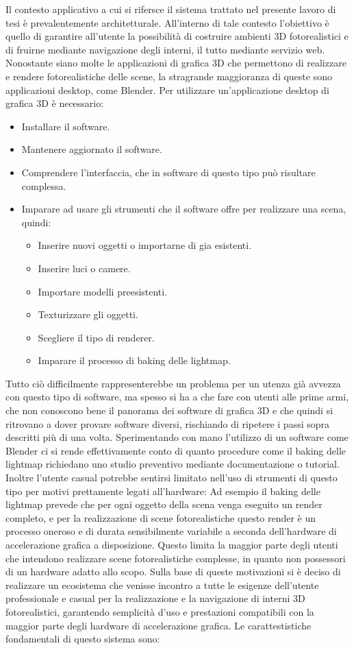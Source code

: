 Il contesto applicativo a cui si rifersce il sistema trattato nel presente lavoro di tesi è prevalentemente architetturale.
All’interno di tale contesto l’obiettivo è quello di garantire all’utente la possibilità di costruire ambienti 3D fotorealistici e di fruirne mediante navigazione degli interni, il tutto mediante servizio web. 
Nonostante siano molte le applicazioni di grafica 3D che permettono di realizzare e rendere fotorealistiche delle scene, la stragrande maggioranza di queste sono applicazioni desktop, come Blender.
Per utilizzare un’applicazione desktop di grafica 3D è necessario:
\begin{itemize}
\item Installare il software.
\item Mantenere aggiornato il software.
\item Comprendere l’interfaccia, che in software di questo tipo può risultare complessa.
\item Imparare ad usare gli strumenti che il software offre per realizzare una scena, quindi:
\begin{itemize}
\item Inserire nuovi oggetti o importarne di gia esistenti.
\item Inserire luci o camere.
\item Importare modelli preesistenti. 
\item Texturizzare gli oggetti.
\item Scegliere il tipo di renderer.
\item Imparare il processo di baking delle lightmap.
\end{itemize}
\end{itemize}
Tutto ciò difficilmente rappresenterebbe un problema per un utenza già avvezza con questo tipo di software, ma spesso si ha a che fare con utenti alle prime armi, che non conoscono bene il panorama dei software di grafica 3D e che quindi si ritrovano a dover provare software diversi, rischiando di ripetere i passi sopra descritti più di una volta. Sperimentando con mano l’utilizzo di un software come Blender ci si rende effettivamente conto di quanto procedure come il baking delle lightmap richiedano uno studio preventivo mediante documentazione o tutorial. Inoltre l’utente casual potrebbe sentirsi limitato nell’uso di strumenti di questo tipo per motivi prettamente legati all’hardware:
Ad esempio il baking delle lightmap prevede che per ogni oggetto della scena venga eseguito un render completo, e per la realizzazione di scene fotorealistiche questo render è un processo oneroso e di durata sensibilmente variabile a seconda dell’hardware di accelerazione grafica a disposizione. Questo limita la maggior parte degli utenti che intendono realizzare scene fotorealistiche complesse, in quanto non possessori di un hardware adatto allo scopo. Sulla base di queste motivazioni si è deciso di realizzare un ecosistema che venisse incontro a tutte le esigenze dell’utente professionale e casual per la realizzazione e la navigazione di interni 3D fotorealistici, garantendo semplicità d’uso e prestazioni compatibili con la maggior parte degli hardware di accelerazione grafica. Le carattestistiche fondamentali di questo sistema sono:
